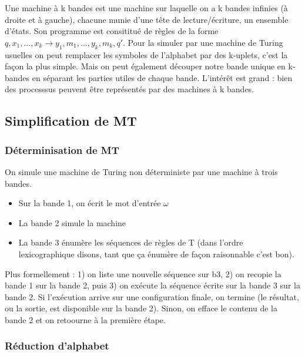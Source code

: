 \documentclass{article}
\begin{document}
Une machine à k bandes est une machine sur laquelle on a k bandes infinies (à droite et à gauche), chacune munie d'une tête de lecture/écriture, un ensemble d'états. Son programme est consititué de règles de la forme $q,x_1,...,x_k \rightarrow y_1, m_1,...,y_k, m_k, q'$. Pour la simuler par une machine de Turing usuelles on peut remplacer les symboles de l'alphabet par des k-uplets, c'est la façon la plus simple. Mais on peut également découper notre bande unique en k-bandes en séparant les parties utiles de chaque bande. L'intérêt est grand : bien des processsus peuvent être représentés par des machines à k bandes.


\subsection{Simplification de MT}

\subsubsection{Déterminisation de MT}

On simule une machine de Turing non déterministe par une machine à trois bandes. 
\begin{itemize}
    \item Sur la bande 1, on écrit le mot d'entrée $\omega$
    \item La bande 2 simule la machine 
    \item La bande 3 énumère les séquences de règles de T (dans l'ordre lexicographique disons, tant que ça énumère de façon raisonnable c'est bon). 
\end{itemize}

Plus formellement : 1) on liste une nouvelle séquence sur b3, 2) on recopie la bande 1 sur la bande 2, puis 3) on exécute la séquence écrite sur la bande 3 sur la bande 2. Si l'exécution arrive sur une configuration finale, on termine (le résultat, ou la sortie, est disponible sur la bande 2). Sinon, on efface le contenu de la bande 2 et on retoourne à la première étape. 

\subsubsection{Réduction d'alphabet}
\end{document}
